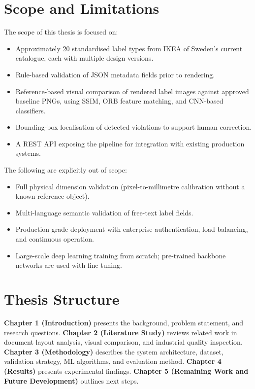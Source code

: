 \section{Scope and Limitations}
\label{sec:scope}

The scope of this thesis is focused on:
\begin{itemize}
  \item Approximately 20 standardised label types from IKEA of Sweden's current
  catalogue, each with multiple design versions.
  \item Rule-based validation of JSON metadata fields prior to rendering.
  \item Reference-based visual comparison of rendered label images against approved
  baseline PNGs, using SSIM, ORB feature matching, and CNN-based classifiers.
  \item Bounding-box localisation of detected violations to support human correction.
  \item A REST API exposing the pipeline for integration with existing production systems.
\end{itemize}

The following are explicitly out of scope:
\begin{itemize}
  \item Full physical dimension validation (pixel-to-millimetre calibration without a
  known reference object).
  \item Multi-language semantic validation of free-text label fields.
  \item Production-grade deployment with enterprise authentication, load balancing, and
  continuous operation.
  \item Large-scale deep learning training from scratch; pre-trained backbone networks
  are used with fine-tuning.
\end{itemize}

\section{Thesis Structure}
\label{sec:structure}

\textbf{Chapter 1 (Introduction)} presents the background, problem statement, and
research questions. \textbf{Chapter 2 (Literature Study)} reviews related work in document
layout analysis, visual comparison, and industrial quality inspection. \textbf{Chapter 3
(Methodology)} describes the system architecture, dataset, validation strategy,
ML algorithms, and evaluation method. \textbf{Chapter 4 (Results)} presents experimental
findings. \textbf{Chapter 5 (Remaining Work and Future Development)} outlines next steps.

